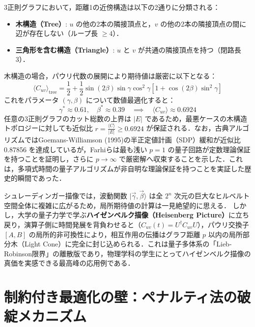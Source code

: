 \documentclass[11pt,a4paper,oneside,openany]{ltjsbook}
\theoremstyle{definition}
\theoremstyle{plain}
\theoremstyle{remark}
\newcommand{\ket}[1]{|#1\rangle}
\begin{document}
3正則グラフにおいて，距離1の近傍構造は以下の2通りに分類される：
\begin{itemize}
    \item \textbf{木構造（Tree）}: $u$ の他の2本の隣接頂点と，$v$ の他の2本の隣接頂点の間に辺が存在しない（ループ長 $\ge 4$）．
    \item \textbf{三角形を含む構造（Triangle）}: $u$ と $v$ が共通の隣接頂点を持つ（閉路長 3）．
\end{itemize}

木構造の場合，パウリ代数の展開により期待値は厳密に以下となる：
\begin{equation}
    \langle C_{uv} \rangle_{\text{tree}} = \frac{1}{2} + \frac{1}{2} \sin(2\beta) \sin\gamma \cos^2\gamma \left[ 1 + \cos(2\beta) \sin^2\gamma \right]
\end{equation}
これをパラメータ $(\gamma, \beta)$ について数値最適化すると：
\begin{equation}
    \gamma^* \approx 0.61, \quad \beta^* \approx 0.39 \quad \implies \quad \langle C_{uv} \rangle \approx 0.6924
\end{equation}
任意の3正則グラフのカット総数の上界は $|E|$ であるため，最悪ケースの木構造トポロジーに対しても近似比 $r = \frac{\langle C \rangle}{|E|} \ge \mathbf{0.6924}$ が保証される\cite{farhi2014quantum}．なお，古典アルゴリズムではGoemans-Williamson (1995)\cite{goemans1995improved}の半正定値計画（SDP）緩和が近似比 0.87856 を達成しているが，Farhiらは最も浅い $p=1$ の量子回路が定数理論保証を持つことを証明し，さらに $p \to \infty$ で厳密解へ収束することを示した．これは，多項式時間の量子アルゴリズムが非自明な理論保証を持つことを実証した歴史的瞬間であった．

\enlargethispage{2.5\baselineskip}
\begin{insightbox}[ハイゼンベルク描像がもたらす幾何学的奇跡]
シュレーディンガー描像では，波動関数 $\ket{\vec{\gamma}, \vec{\beta}}$ は全 $2^n$ 次元の巨大なヒルベルト空間全体に複雑に広がるため，局所期待値の計算は一見絶望的に思える．
しかし，大学の量子力学で学ぶ\textbf{ハイゼンベルク描像（Heisenberg Picture）}に立ち戻り，演算子側に時間発展を背負わせると（$C_{uv}(t) = U^\dagger C_{uv} U$），パウリ交換子 $[A, B]$ の局所的非可換性により，相互作用の伝播はグラフ距離 $p$ 以内の局所部分木（Light Cone）に完全に封じ込められる．これは量子多体系の「Lieb-Robinson限界」の離散版であり，物理学科の学生にとってハイゼンベルク描像の真価を実感できる最高峰の応用例である．
\end{insightbox}

\chapter{制約付き最適化の壁：ペナルティ法の破綻メカニズム}
\enlargethispage{5\baselineskip}
\vspace{-4mm}
\end{document}

